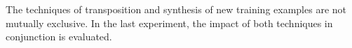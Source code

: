 
The techniques of transposition and synthesis of new
training examples are not mutually exclusive. In the last
experiment, the impact of both techniques in conjunction is
evaluated.

